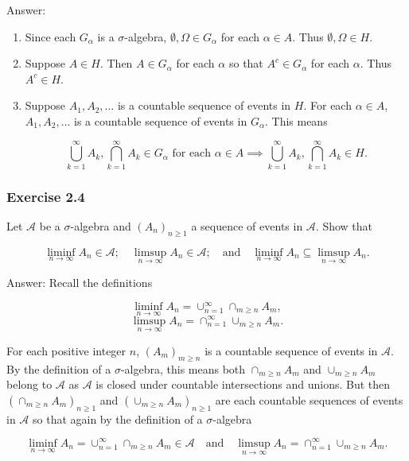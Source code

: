 \documentclass{article}
\begin{document}
Answer:

\begin{enumerate}
\item Since each $G_\alpha$ is a $\sigma$-algebra, $\emptyset, \Omega \in G_\alpha$ for each $\alpha \in A$. Thus $\emptyset, \Omega \in H$. 

\item Suppose $A \in H$. Then $A \in G_\alpha$ for each $\alpha$ so that $A^c \in G_\alpha$ for each $\alpha$. Thus $A^c \in H$. 


\item Suppose $A_1, A_2, \dots$ is a countable sequence of events in $H$. For each $\alpha \in A$, $A_1, A_2, \dots$ is a countable sequence of events in $G_\alpha$. This means

$$\bigcup_{k=1}^\infty A_k, \bigcap_{k=1}^\infty A_k \in G_\alpha \text{ for each } \alpha \in A \implies \bigcup_{k=1}^\infty A_k, \bigcap_{k=1}^\infty A_k \in H.$$
\end{enumerate}


\subsubsection*{Exercise 2.4}

Let $\mathcal{A}$ be a $\sigma$-algebra and $(A_n)_{n\geq 1}$ a sequence of events in $\mathcal{A}$. Show that

$$\liminf_{n\rightarrow \infty} A_n \in \mathcal{A}; \quad \limsup_{n\rightarrow \infty} A_n \in \mathcal{A}; \quad \text{and} \quad \liminf_{n\rightarrow \infty} A_n \subseteq \limsup_{n\rightarrow \infty} A_n.$$

Answer: Recall the definitions

$$
\liminf_{n\rightarrow \infty} A_n = \cup_{n=1}^\infty \cap_{m \geq n} A_m,
$$
$$
\limsup_{n\rightarrow \infty} A_n = \cap_{n=1}^\infty \cup_{m \geq n} A_m.
$$

For each positive integer $n$, $(A_m)_{m\geq n}$ is a countable sequence of events in $\mathcal{A}$. By the definition of a $\sigma$-algebra, this means both $\cap_{m\geq n} A_m$ and $\cup_{m\geq n} A_m$ belong to $\mathcal{A}$ as $\mathcal{A}$ is closed under countable intersections and unions. But then $(\cap_{m\geq n} A_m)_{n \geq 1}$ and $(\cup_{m\geq n} A_m)_{n\geq 1}$ are each countable sequences of events in $\mathcal{A}$ so that again by the definition of a $\sigma$-algebra

$$
\liminf_{n\rightarrow \infty} A_n = \cup_{n=1}^\infty \cap_{m \geq n} A_m \in \mathcal{A} \quad \text{and} \quad \limsup_{n\rightarrow \infty} A_n = \cap_{n=1}^\infty \cup_{m \geq n} A_m.
$$
\end{document}
